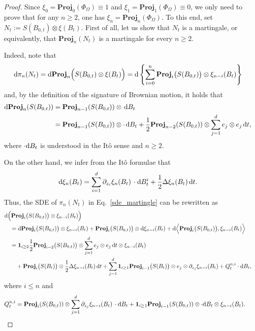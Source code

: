 \documentclass[11pt,a4paper,english,reqno]{amsart}
\theoremstyle{plain}
\newcommand{\dd}{{\rm d}}
\newcommand{\1}{\mathbbm{1}}
\newcommand{\proj}{\mathbf{Proj}}
\begin{document}
\begin{proof}
Since $\xi_{0} = \proj_0(\Phi_{\Omega}) \equiv  1$ and $\xi_{1} = \proj_{1}(\Phi_{\Omega}) \equiv 0$, we only need to prove that for any $n \geq 2$, one has $\xi_{n} = \proj_{n}(\Phi_{\Omega})$. To this end, set $N_{t} := S(B_{0, t}) \otimes \xi(B_{t})$. First of all, let us show that $N_{t}$ is a martingale, or equivalently, that $\proj_{n}(N_{t})$ is a martingale for every $n \geq 2$.

Indeed, note that
\begin{align}\label{sde_martingle}
\dd\pi_{n}(N_{t}) = \dd\proj_{n}\Big(S(B_{0, t}) \otimes \xi(B_{t})\Big) 
= \dd \left\{\sum_{i = 0}^{n}\proj_{i}\big(S(B_{0, t})\big) \otimes \xi_{n-i}(B_{t})\right\}
\end{align}
and, by the definition of the signature of Brownian motion, it holds that
\begin{align*}
\dd\proj_{n}(S(B_{0, t})) &= \proj_{n-1}(S(B_{0, t}))\otimes \,\dd B_{t} \nonumber\\
&=\proj_{n-1}(S(B_{0, t}))\otimes \cdot \,\dd B_{t} + \frac{1}{2}\proj_{n-2}(S(B_{0, t})) \otimes \sum_{j=1}^{d}  e_{j}\otimes e_{j}\, \dd t,
\end{align*}
where $\cdot \dd B_{t}$ is understood in the It\^{o} sense and $n \geq 2$.


On the other hand, we infer from the It\^o formulae that
\begin{eqnarray*}
\dd\xi_{n}(B_{t}) = \sum_{i = 1}^{d}\partial_{z_{i}}\xi_{n}(B_{t})\,\cdot \dd B^{i}_{t} + \frac{1}{2}\Delta \xi_{n}(B_{t})\,\dd t.
\end{eqnarray*}
Thus, the SDE of $\pi_{n}({N}_{t})$ in Eq.~\eqref{sde_martingle} can be rewritten as 
\begin{align*}
&\dd \Big(\proj_{i}\big(S(B_{0, t})\big) \otimes \xi_{n-i}(B_{t}) \Big) \\
&\quad = \dd \proj_{i}\big(S(B_{0, t})\big) \otimes \xi_{n-i}(B_{t}) +  \proj_{i}\big(S(B_{0, t})\big) \otimes \dd\xi_{n-i}(B_{t}) + \dd\Big\langle \proj_{i}\big(S(B_{0, t})\big),  \xi_{n-i}(B_{t})\Big\rangle \\
&\quad= \mathbf{1}_{i\geq 2}\frac{1}{2}\proj_{i-2}\big(S(B_{0, t})\big) \otimes \sum_{j=1}^{d}e_{j}\otimes e_{j} \,\dd t \otimes \xi_{n-i}(B_{t}) \\
&\qquad+ \proj_{i}\big(S(B_{t})\big)\otimes \frac{1}{2}\Delta \xi_{n-i}(B_{t})\,\dd t+ \sum_{j =1}^{d} \mathbf{1}_{i\geq 1}\proj_{i-1}\big(S(B_{t})\big)\otimes e_{j}\otimes \partial_{z_{j}}\xi_{n-i}(B_{t})+ Q^{n, i}_{t}\cdot \dd B_{t},
\end{align*}
where $i \leq n$ and
\begin{align*}
Q^{n, i}_{t} &= \proj_{i}(S(B_{0, t}))\otimes \sum_{j = 1}^{d}\partial_{z_{j}}\xi_{n-i}(B_{t})\,\cdot \dd B_{t} + \mathbf{1}_{i\geq 1}\proj_{i-1}(S(B_{0, t}))\otimes \cdot \dd B_{t} \otimes \xi_{n-i}(B_{t}).
\end{align*}


\end{proof}
\end{document}
